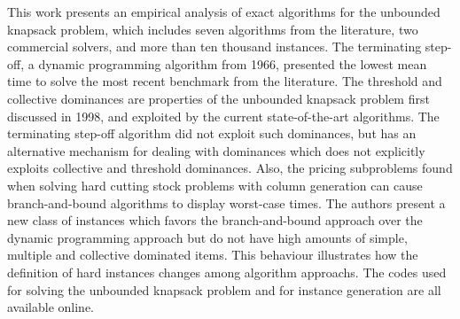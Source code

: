 This work presents an empirical analysis of exact algorithms for the unbounded knapsack problem, which includes seven algorithms from the literature, two commercial solvers, and more than ten thousand instances.
The terminating step-off, a dynamic programming algorithm from 1966, presented the lowest mean time to solve the most recent benchmark from the literature.
The threshold and collective dominances are properties of the unbounded knapsack problem first discussed in 1998, and exploited by the current state-of-the-art algorithms. 
The terminating step-off algorithm did not exploit such dominances, but has an alternative mechanism for dealing with dominances which does not explicitly exploits collective and threshold dominances.
Also, the pricing subproblems found when solving hard cutting stock problems with column generation can cause branch-and-bound algorithms to display worst-case times.
The authors present a new class of instances which favors the branch-and-bound approach over the dynamic programming approach but do not have high amounts of simple, multiple and collective dominated items.
This behaviour illustrates how the definition of hard instances changes among algorithm approachs.
The codes used for solving the unbounded knapsack problem and for instance generation are all available online.
